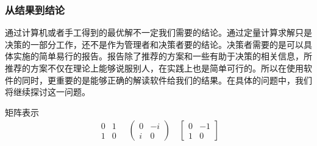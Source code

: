 \subsubsection{从结果到结论}
\begin{frame}{\subsubsecname}
   通过计算机或者手工得到的最优解不一定我们需要的结论。通过定量计算求解只是决策的一部分工作，还不是作为管理者和决策者要的结论。决策者需要的是可以具体实施的简单易行的报告。报告除了推荐的方案和一些有助于决策的相关信息，所推荐的方案不仅在理论上能够说服别人，在实践上也是简单可行的。所以在使用软件的同时，更重要的是能够正确的解读软件给我们的结果。在具体的问题中，我们将继续探讨这一问题。
\end{frame}



\begin{frame}{矩阵表示}
$$
\begin{gathered}
    \begin{matrix}
    0&1 \\ 1&0
    \end{matrix}
    \quad
    \begin{pmatrix}
    0 &-i \\ i &0
    \end{pmatrix}
    \quad
    \begin{bmatrix}
    0 & -1\\1&0
    \end{bmatrix}
\end{gathered}
$$
\end{frame}
